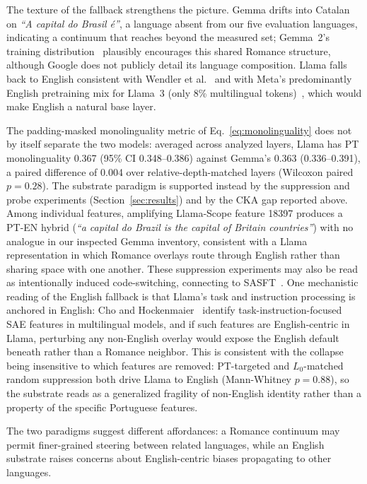 \documentclass[runningheads]{llncs}
\begin{document}
The texture of the fallback strengthens the picture. Gemma drifts into Catalan on \emph{``A capital do Brasil \'e''}, a language absent from our five evaluation languages, indicating a continuum that reaches beyond the measured set; Gemma~2's training distribution~\cite{gemma2_team2024} plausibly encourages this shared Romance structure, although Google does not publicly detail its language composition. Llama falls back to English consistent with Wendler et al.~\cite{wendler2024llamas} and with Meta's predominantly English pretraining mix for Llama~3 (only 8\% multilingual tokens)~\cite{grattafiori2024llama3}, which would make English a natural base layer.

The padding-masked monolinguality metric of Eq.~\ref{eq:monolinguality} does not by itself separate the two models: averaged across analyzed layers, Llama has PT monolinguality 0.367 (95\% CI 0.348--0.386) against Gemma's 0.363 (0.336--0.391), a paired difference of 0.004 over relative-depth-matched layers (Wilcoxon paired $p = 0.28$). The substrate paradigm is supported instead by the suppression and probe experiments (Section~\ref{sec:results}) and by the CKA gap reported above. Among individual features, amplifying Llama-Scope feature 18397 produces a PT-EN hybrid (\emph{``a capital do Brazil is the capital of Britain countries''}) with no analogue in our inspected Gemma inventory, consistent with a Llama representation in which Romance overlays route through English rather than sharing space with one another. These suppression experiments may also be read as intentionally induced code-switching, connecting to SASFT~\cite{sasft2026}. One mechanistic reading of the English fallback is that Llama's task and instruction processing is anchored in English: Cho and Hockenmaier~\cite{cho2025analyzing} identify task-instruction-focused SAE features in multilingual models, and if such features are English-centric in Llama, perturbing any non-English overlay would expose the English default beneath rather than a Romance neighbor. This is consistent with the collapse being insensitive to which features are removed: PT-targeted and $L_0$-matched random suppression both drive Llama to English (Mann-Whitney $p = 0.88$), so the substrate reads as a generalized fragility of non-English identity rather than a property of the specific Portuguese features.

The two paradigms suggest different affordances: a Romance continuum may permit finer-grained steering between related languages, while an English substrate raises concerns about English-centric biases propagating to other languages.
\end{document}
